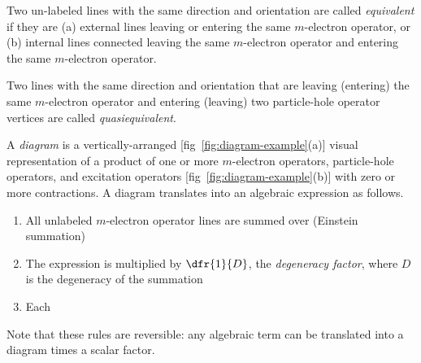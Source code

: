 \documentclass[11pt,fleqn]{article}
\numberwithin{equation}{section}
\begin{document}
\begin{dfn}
Two un-labeled lines with the same direction and orientation are called \textit{equivalent} if they are (a) external lines leaving or entering the same $m$-electron operator, or (b) internal lines connected leaving the same $m$-electron operator and entering the same $m$-electron operator.
\end{dfn}

\begin{dfn}
Two lines with the same direction and orientation that are leaving (entering) the same $m$-electron operator and entering (leaving) two particle-hole operator vertices are called \textit{quasiequivalent}.
\end{dfn}

\begin{dfn}\label{dfn:diagram}
A \textit{diagram} is a vertically-arranged [fig~\ref{fig:diagram-example}(a)] visual representation of a product of one or more $m$-electron operators, particle-hole operators, and excitation operators [fig~\ref{fig:diagram-example}(b)] with zero or more contractions.
A diagram translates into an algebraic expression as follows.
\begin{enumerate}
  \item\label{dfn:diagram:item:sum}
  All unlabeled $m$-electron operator lines are summed over (Einstein summation)
  \item\label{dfn:diagram:item:degeneracy-factor}
  The expression is multiplied by $\dfr{1}{D}$, the \textit{degeneracy factor}, where $D$ is the degeneracy of the summation
  \item\label{dfn:diagram:item:permutation-factor}
  Each 
\end{enumerate}
Note that these rules are reversible: any algebraic term can be translated into a diagram times a scalar factor.
\end{dfn}
\end{document}
